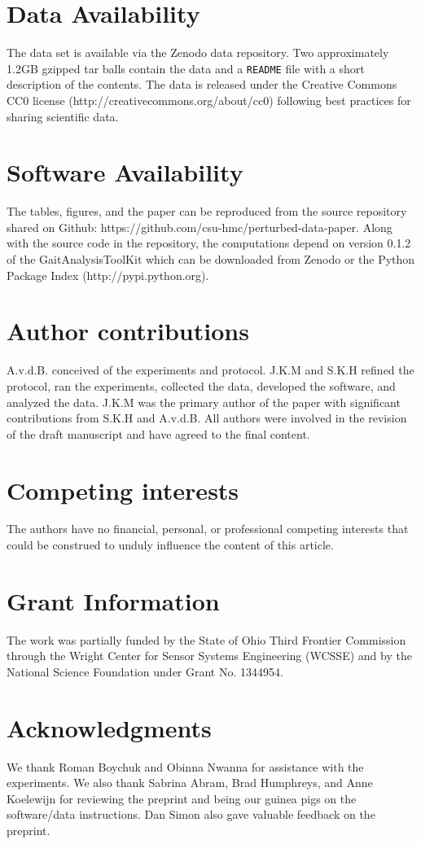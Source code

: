 \documentclass[fleqn,12pt]{wlpeerj}
\begin{document}
\section*{Data Availability}
%
The data set \citep{Moore2014} is available via the Zenodo data repository.
Two approximately 1.2GB gzipped tar balls contain the data and a \verb|README|
file with a short description of the contents. The data is released under the
Creative Commons CC0 license (http://creativecommons.org/about/cc0) following
best practices for sharing scientific data.

\section*{Software Availability}
%
The tables, figures, and the paper can be reproduced from the source
repository shared on Github: https://github.com/csu-hmc/perturbed-data-paper.
Along with the source code in the repository, the computations depend on
version 0.1.2 of the GaitAnalysisToolKit \citep{Moore2014a} which can be
downloaded from Zenodo or the Python Package Index (http://pypi.python.org).

\section*{Author contributions}
A.v.d.B. conceived of the experiments and protocol. J.K.M and S.K.H refined the
protocol, ran the experiments, collected the data, developed the software, and
analyzed the data. J.K.M was the primary author of the paper with significant
contributions from S.K.H and A.v.d.B. All authors were involved in the revision
of the draft manuscript and have agreed to the final content.

\section*{Competing interests}
The authors have no financial, personal, or professional competing interests
that could be construed to unduly influence the content of this article.

\section*{Grant Information}
The work was partially funded by the State of Ohio Third Frontier Commission
through the Wright Center for Sensor Systems Engineering (WCSSE) and by the
National Science Foundation under Grant No. 1344954.

\section*{Acknowledgments}
%
We thank Roman Boychuk and Obinna Nwanna for assistance with the experiments.
We also thank Sabrina Abram, Brad Humphreys, and Anne Koelewijn for reviewing
the preprint and being our guinea pigs on the software/data instructions. Dan
Simon also gave valuable feedback on the preprint.


\end{document}
